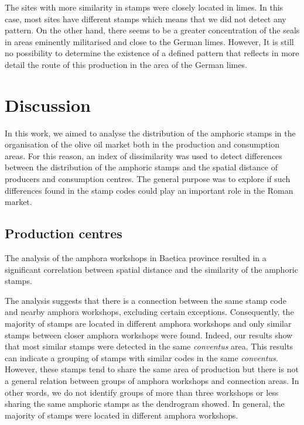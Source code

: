 \documentclass[review]{elsarticle}
\begin{document}
The sites with more similarity in stamps were closely located in limes. In this case, most sites have different stamps which means that we did not detect any pattern. On the other hand, there seems to be a greater concentration of the seals in areas eminently militarised and close to the German limes. However, It is still no possibility to determine the existence of a defined pattern that reflects in more detail the route of this production in the area of the German limes.


\section{Discussion}


In this work, we aimed to analyse the distribution of the amphoric stamps in the organisation of the olive oil market both in the production and consumption areas. For this reason, an index of dissimilarity was used to detect differences between the distribution of the amphoric stamps and the spatial distance of producers and consumption centres. The general purpose was to explore if such differences found in the stamp codes could play an important role in the Roman market.  

\subsection{Production centres}

The analysis of the amphora workshops in Baetica province resulted in a significant correlation between spatial distance and the similarity of the amphoric stamps. 

The analysis suggests that there is  a connection between the same stamp code and nearby amphora workshops, excluding certain exceptions. Consequently, the majority of stamps are located in different amphora workshops and only similar stamps between closer amphora workshops were found. Indeed, our results show that most similar stamps were detected in the same \textit{conventus} area. This results can indicate a grouping of stamps with similar codes in the same \textit{conventus}. However, these stamps tend to share the same area of production but there is not a general relation between groups of amphora workshops and connection areas. In other words, we do not identify groups of more than three workshops or less sharing the same amphoric stamps as the dendrogram showed. In general, the majority of stamps were located in different amphora workshops. 
\end{document}
